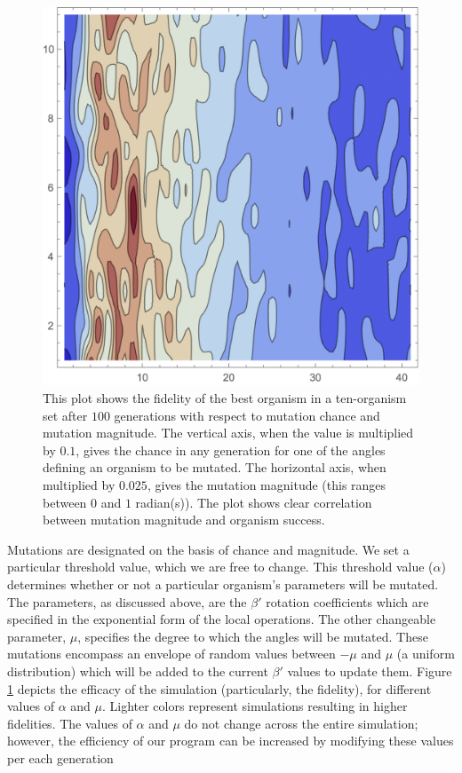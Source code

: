 \documentclass[11pt,twocolumn]{article}
\begin{document}
	\begin{figure}[htpb]
		\centering
			\includegraphics[scale=0.5]{efficiency_plot_col.png}
		\centering
		\caption{This plot shows the fidelity of the best organism in a ten-organism set after $100$ generations with respect to mutation chance and mutation magnitude. The vertical axis, when the value is multiplied by $0.1$, gives the chance in any generation for one of the angles defining an organism to be mutated. The horizontal axis, when multiplied by $0.025$, gives the mutation magnitude (this ranges between $0$ and $1$ radian(s)). The plot shows clear correlation between mutation magnitude and organism success.}
		\label{fig:effplot}
	\end{figure}

	Mutations are designated on the basis of chance and magnitude. We set a particular threshold value, which we are free to change. This threshold value ($\alpha$) determines whether or not a particular organism's parameters will be mutated. The parameters, as discussed above, are the $\beta '$ rotation coefficients which are specified in the exponential form of the local operations. The other changeable parameter, $\mu$, specifies the degree to which the angles will be mutated. These mutations encompass an envelope of random values between $-\mu$ and $\mu$  (a uniform distribution) which will be added to the current $\beta'$ values to update them.  Figure \ref{fig:effplot} depicts the efficacy of the simulation (particularly, the fidelity), for different values of $\alpha$ and $\mu$.  Lighter colors represent simulations resulting in higher fidelities. The values of $\alpha$ and $\mu$ do not change across the entire simulation; however, the efficiency of our program can be increased by modifying these values per each generation
\end{document}
